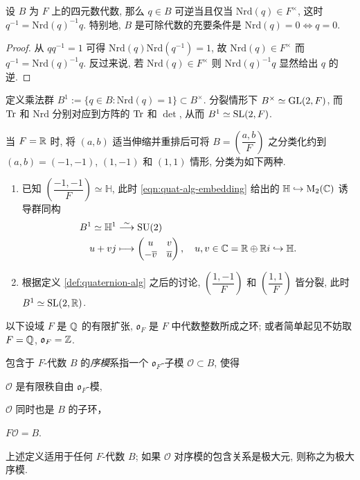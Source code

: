 \begin{proposition}
	设 $B$ 为 $F$ 上的四元数代数, 那么 $q \in B$ 可逆当且仅当 $\mathrm{Nrd}(q) \in F^\times$, 这时 $q^{-1} = \mathrm{Nrd}(q)^{-1} q$. 特别地, $B$ 是可除代数的充要条件是 $\mathrm{Nrd}(q) = 0 \iff q = 0$.
\end{proposition}
\begin{proof}
	从 $qq^{-1} = 1$ 可得 $\mathrm{Nrd}(q) \mathrm{Nrd}(q^{-1}) = 1$, 故 $\mathrm{Nrd}(q) \in F^\times$ 而 $q^{-1} = \mathrm{Nrd}(q)^{-1} q$. 反过来说, 若 $\mathrm{Nrd}(q) \in F^\times$ 则 $\mathrm{Nrd}(q)^{-1} q$ 显然给出 $q$ 的逆.
\end{proof}

定义乘法群 $B^1 := \{q \in B: \text{Nrd}(q)=1 \} \subset B^\times$. 分裂情形下 $B^\times \simeq \operatorname{GL}(2,F)$, 而 $\operatorname{Tr}$ 和 $\text{Nrd}$ 分别对应到方阵的 $\operatorname{Tr}$ 和 $\det$, 从而 $B^1 \simeq \operatorname{SL}(2,F)$.

\begin{example}\label{eg:quaternion-real}
	当 $F = \mathbb{R}$ 时, 将 $(a,b)$ 适当伸缩并重排后可将 $B = \left( \dfrac{a,b}{F} \right)$ 之分类化约到 $(a,b) = (-1,-1)$, $(1, -1)$ 和 $(1, 1)$ 情形, 分类为如下两种.
	\begin{enumerate}
		\item 已知 $\left( \dfrac{-1, -1}{F} \right) \simeq \mathbb{H}$, 此时 \eqref{eqn:quat-alg-embedding} 给出的 $\mathbb{H} \hookrightarrow \operatorname{M}_2(\mathbb{C})$ 诱导群同构
		\begin{align*}
			B^1 \simeq \mathbb{H}^1 & \stackrel{\sim}{\longrightarrow} \operatorname{SU}(2) \\
			u + vj & \longmapsto \begin{pmatrix} u & v \\ -\overline{v} & \overline{u} \end{pmatrix}, \quad u,v \in \mathbb{C} = \mathbb{R} \oplus \mathbb{R} i \hookrightarrow \mathbb{H}.
		\end{align*}
		\item 根据定义 \ref{def:quaternion-alg} 之后的讨论, $\left( \dfrac{1, -1}{F} \right)$ 和 $\left( \dfrac{1, 1}{F} \right)$ 皆分裂, 此时 $B^1 \simeq \operatorname{SL}(2,\mathbb{R})$.
	\end{enumerate}
\end{example}

以下设域 $F$ 是 $\mathbb{Q}$ 的有限扩张, $\mathfrak{o}_F$ 是 $F$ 中代数整数所成之环; 或者简单起见不妨取 $F=\mathbb{Q}$, $\mathfrak{o}_F = \mathbb{Z}$.

\begin{definition}\label{def:order}
	包含于 $F$-代数 $B$ 的\emph{序模}系指一个 $\mathfrak{o}_F$-子模 $\mathcal{O} \subset B$, 使得
	\begin{compactitem}
		\item $\mathcal{O}$ 是有限秩自由 $\mathfrak{o}_F$-模,
		\item $\mathcal{O}$ 同时也是 $B$ 的子环，
		\item $F\mathcal{O} = B$.
	\end{compactitem}
	上述定义适用于任何 $F$-代数 $B$; 如果 $\mathcal{O}$ 对序模的包含关系是极大元, 则称之为极大序模.
\end{definition}

